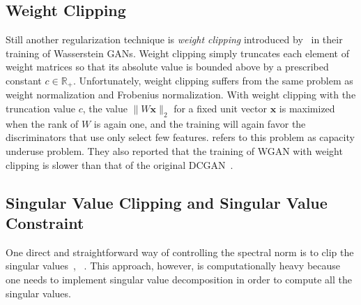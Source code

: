 \documentclass{article}
\newcommand{\bbR}{\mathbb{R}}
\newcommand{\bmx}{{\bm x}}
\begin{document}
\subsection{Weight Clipping}
Still another regularization technique is \textit{weight clipping}
introduced by~\cite{arjovsky2017wasserstein} in their training of Wasserstein GANs.
Weight clipping simply truncates each element of weight matrices so that its absolute value is bounded above by a prescribed constant $c \in \bbR_+$.
Unfortunately, weight clipping suffers from the same problem as weight normalization and Frobenius normalization.
With weight clipping with the truncation value $c$, the value $\|W\bmx\|_2$ for a fixed unit vector $\bmx$ is maximized when the rank of $W$ is again one, and the training will again favor the discriminators that use only select few features. %
\cite{gulrajani2017improved} refers to this problem as capacity underuse problem.
They also reported that the training of WGAN with weight clipping is slower than that of the original DCGAN~\cite[]{radford2015unsupervised}.


\subsection{Singular Value Clipping and Singular Value Constraint}
One direct and straightforward way of controlling the spectral norm is to clip the singular values~\cite[]{saito2016temporal}, ~\cite[]{jia2016improving}.
This approach, however, is computationally heavy because one needs to implement singular value decomposition in order to compute all the singular values.
\end{document}
